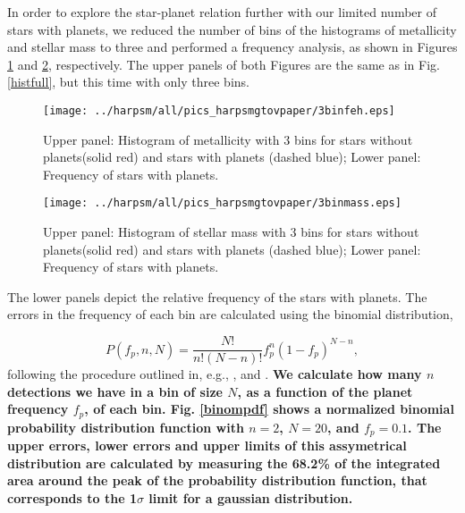 \documentclass[structabstract]{aa}
\begin{document}

In order to explore the star-planet relation further with our limited number of stars with planets, we reduced the number of bins of the histograms of metallicity and stellar mass to three and performed a frequency analysis, as shown in Figures \ref{3binfeh} and \ref{3binmass}, respectively. The upper panels of both Figures are the same as in Fig. \ref{histfull}, but this time with only three bins. 

\begin{figure}[h]
\begin{center}
\texttt{[image: ../harpsm/all/pics\_harpsmgtovpaper/3binfeh.eps]}
\end{center}
\caption{Upper panel: Histogram of metallicity with 3 bins for stars without planets(solid red) and stars with planets (dashed blue); Lower panel: Frequency of stars with planets.}
\label{3binfeh}
\end{figure}

\begin{figure}[h]
\begin{center}
\texttt{[image: ../harpsm/all/pics\_harpsmgtovpaper/3binmass.eps]}
\end{center}
\caption{Upper panel: Histogram of stellar mass with 3 bins for stars without planets(solid red) and stars with planets (dashed blue); Lower panel: Frequency of stars with planets.}
\label{3binmass}
\end{figure}


The lower panels depict the relative frequency of the stars with planets. The errors in the frequency of each bin are calculated using the binomial distribution, 

\begin{equation}
P(f_{p},n,N) = \frac{N!}{n!(N-n)!}f^{n}_{p}(1-f_{p})^{N-n},
\label {binom}
\end{equation}
following the procedure outlined in, e.g., \citet[][]{Burgasser-2003,McCarthy-2004, Endl-2006}, and \citet{Sozzetti-2009}. \textbf{We calculate how many $n$ detections we have in a bin of size $N$, as a function of the planet frequency $f_{p}$, of each bin. Fig. \ref{binompdf} shows a normalized binomial probability distribution function with $n = 2$, $N = 20$, and $f_{p} = 0.1$. The upper errors, lower errors and upper limits of this assymetrical distribution are calculated by measuring the 68.2\% of the integrated area around the peak of the probability distribution function, that corresponds to the 1$\sigma$ limit for a gaussian distribution.} 
\end{document}
